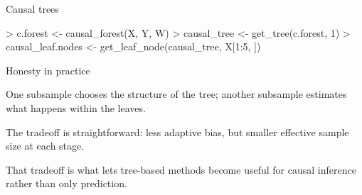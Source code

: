 \documentclass[xcolor={table}, handout]{beamer}
\begin{document}
\begin{frame}[fragile]{Causal trees}

\begin{Schunk}
\begin{Sinput}
> c.forest <- causal_forest(X, Y, W)
> causal_tree <- get_tree(c.forest, 1)
> causal_leaf.nodes <- get_leaf_node(causal_tree, X[1:5, ])
\end{Sinput}
\end{Schunk}

\end{frame}




\begin{frame}{Honesty in practice}

\begin{wideitemize}
\item One subsample chooses the structure of the tree; another subsample estimates what happens within the leaves. \pause
\item The tradeoff is straightforward: less adaptive bias, but smaller effective sample size at each stage. \pause
\item That tradeoff is what lets tree-based methods become useful for causal inference rather than only prediction.
\end{wideitemize}

\end{frame}


\end{document}
